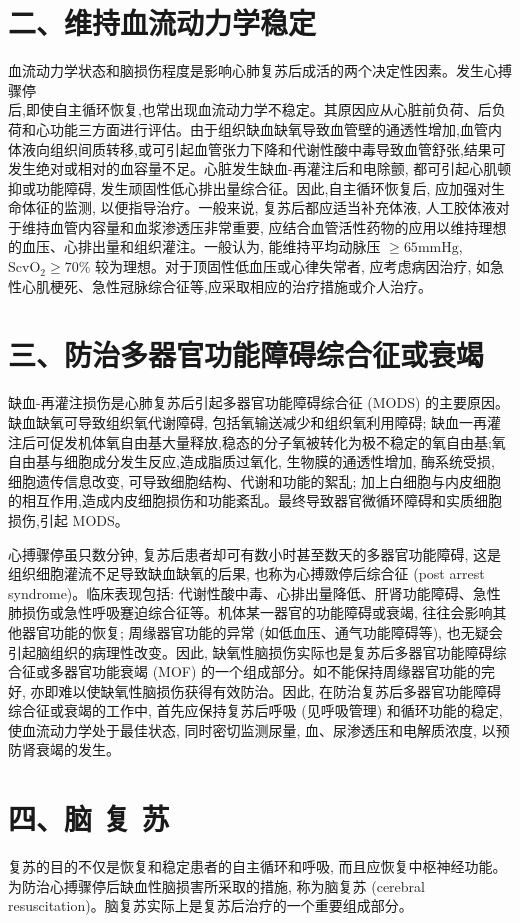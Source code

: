 \documentclass[10pt]{article}
\begin{document}
\section*{二、维持血流动力学稳定}
血流动力学状态和脑损伤程度是影响心肺复苏后成活的两个决定性因素。发生心搏骤停\\
后,即使自主循环恢复,也常出现血流动力学不稳定。其原因应从心脏前负荷、后负荷和心功能三方面进行评估。由于组织缺血缺氧导致血管壁的通透性增加,血管内体液向组织间质转移,或可引起血管张力下降和代谢性酸中毒导致血管舒张,结果可发生绝对或相对的血容量不足。心脏发生缺血-再灌注后和电除颤, 都可引起心肌顿抑或功能障碍, 发生顽固性低心排出量综合征。因此,自主循环恢复后, 应加强对生命体征的监测, 以便指导治疗。一般来说, 复苏后都应适当补充体液, 人工胶体液对于维持血管内容量和血浆渗透压非常重要, 应结合血管活性药物的应用以维持理想的血压、心排出量和组织灌注。一般认为, 能维持平均动脉压 $\geqslant 65 \mathrm{mmHg}$, $\mathrm{ScvO}_{2} \geqslant 70 \%$ 较为理想。对于顶固性低血压或心律失常者, 应考虑病因治疗, 如急性心肌梗死、急性冠脉综合征等,应采取相应的治疗措施或介人治疗。

\section*{三、防治多器官功能障碍综合征或衰竭}
缺血-再灌注损伤是心肺复苏后引起多器官功能障碍综合征 (MODS) 的主要原因。缺血缺氧可导致组织氧代谢障碍, 包括氧输送减少和组织氧利用障碍; 缺血一再灌注后可促发机体氧自由基大量释放,稳态的分子氧被转化为极不稳定的氧自由基;氧自由基与细胞成分发生反应,造成脂质过氧化, 生物膜的通透性增加, 酶系统受损, 细胞遗传信息改变, 可导致细胞结构、代谢和功能的絮乱; 加上白细胞与内皮细胞的相互作用,造成内皮细胞损伤和功能紊乱。最终导致器官微循环障碍和实质细胞损伤,引起 MODS。

心搏骤停虽只数分钟, 复苏后患者却可有数小时甚至数天的多器官功能障碍, 这是组织细胞灌流不足导致缺血缺氧的后果, 也称为心搏敪停后综合征 (post arrest syndrome)。临床表现包括: 代谢性酸中毒、心排出量降低、肝肾功能障碍、急性肺损伤或急性呼吸蹇迫综合征等。机体某一器官的功能障碍或衰竭, 往往会影响其他器官功能的恢复; 周缘器官功能的异常 (如低血压、通气功能障碍等), 也无疑会引起脑组织的病理性改变。因此, 缺氧性脑损伤实际也是复苏后多器官功能障碍综合征或多器官功能衰竭 (MOF) 的一个组成部分。如不能保持周缘器官功能的完好, 亦即难以使缺氧性脑损伤获得有效防治。因此, 在防治复苏后多器官功能障碍综合征或衰竭的工作中, 首先应保持复苏后呼吸 (见呼吸管理) 和循环功能的稳定, 使血流动力学处于最佳状态, 同时密切监测尿量, 血、尿渗透压和电解质浓度, 以预防肾衰竭的发生。

\section*{四、脑 复 苏}
复苏的目的不仅是恢复和稳定患者的自主循环和呼吸, 而且应恢复中枢神经功能。为防治心搏骤停后缺血性脑损害所采取的措施, 称为脑复苏 (cerebral resuscitation)。脑复苏实际上是复苏后治疗的一个重要组成部分。
\end{document}
